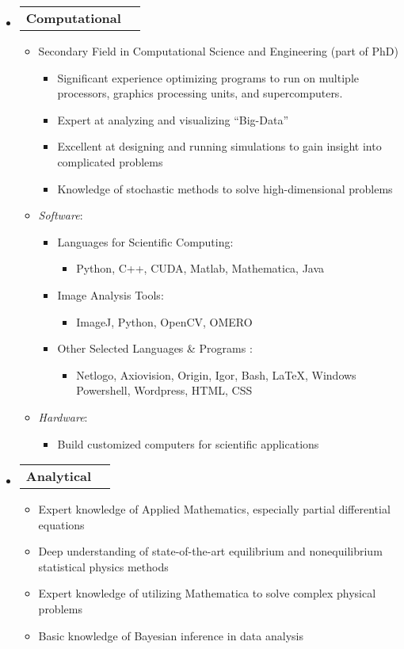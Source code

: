\documentclass[letterpaper,11pt]{article}
\makeatletter
\newcommand{\resitem}[1]{\item #1 \vspace{-2pt}}
\newcommand{\award}[2]{\vspace{-5pt}
\begin{tabular*}{7.0in}{l@{\extracolsep{\fill}}r}
		\textbf{#1} & #2 
\end{tabular*}\vspace{-8pt}}
\makeatother
\begin{document}
\begin{itemize}

\item \award{Computational}{}

\begin{itemize}

\resitem{Secondary Field in Computational Science and Engineering (part of PhD)}
	\begin{itemize}
	\resitem{Significant experience optimizing programs to run on multiple processors, graphics processing units, and supercomputers.}
	\resitem{Expert at analyzing and visualizing ``Big-Data''}
	\resitem{Excellent at designing and running simulations to gain insight into complicated problems}
	\resitem{Knowledge of stochastic methods to solve high-dimensional problems}
	\end{itemize}

\resitem{\textit{Software}:}

\begin{itemize}

	\resitem{Languages for Scientific Computing:} 
		\begin{itemize}
		\resitem{Python, C++, CUDA, Matlab, Mathematica, Java}
		\end{itemize}
		
	\resitem{Image Analysis Tools:}
		\begin{itemize}
		\resitem{ImageJ, Python, OpenCV, OMERO}
		\end{itemize}
	
	\resitem{Other Selected Languages \& Programs}:
		\begin{itemize}
		\resitem{Netlogo, Axiovision, Origin, Igor, Bash, \LaTeX, Windows Powershell, Wordpress, HTML, CSS}
		\end{itemize}
	
\end{itemize}

\resitem{\textit{Hardware}:} 
	\begin{itemize}
	\resitem{Build customized computers for scientific applications}
	\end{itemize}

\end{itemize}

\item \award{Analytical}{}
\begin{itemize}
	\resitem{Expert knowledge of Applied Mathematics, especially partial differential equations}
	\resitem{Deep understanding of state-of-the-art equilibrium and nonequilibrium statistical physics methods}
	\resitem{Expert knowledge of utilizing Mathematica to solve complex physical problems}
	\resitem{Basic knowledge of Bayesian inference in data analysis}
\end{itemize}




\end{itemize}
\end{document}
